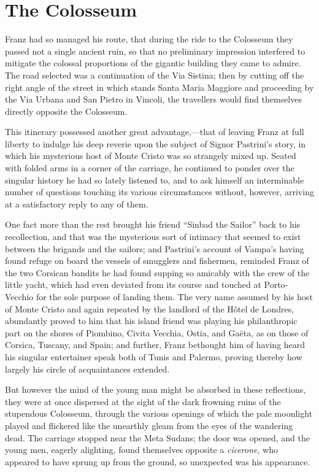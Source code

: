 \chapter{The Colosseum}

Franz had so managed his route, that during the ride to the Colosseum
they passed not a single ancient ruin, so that no preliminary
impression interfered to mitigate the colossal proportions of the
gigantic building they came to admire. The road selected was a
continuation of the Via Sistina; then by cutting off the right angle of
the street in which stands Santa Maria Maggiore and proceeding by the
Via Urbana and San Pietro in Vincoli, the travellers would find
themselves directly opposite the Colosseum.

This itinerary possessed another great advantage,—that of leaving Franz
at full liberty to indulge his deep reverie upon the subject of Signor
Pastrini’s story, in which his mysterious host of Monte Cristo was so
strangely mixed up. Seated with folded arms in a corner of the
carriage, he continued to ponder over the singular history he had so
lately listened to, and to ask himself an interminable number of
questions touching its various circumstances without, however, arriving
at a satisfactory reply to any of them.

One fact more than the rest brought his friend “Sinbad the Sailor” back
to his recollection, and that was the mysterious sort of intimacy that
seemed to exist between the brigands and the sailors; and Pastrini’s
account of Vampa’s having found refuge on board the vessels of
smugglers and fishermen, reminded Franz of the two Corsican bandits he
had found supping so amicably with the crew of the little yacht, which
had even deviated from its course and touched at Porto-Vecchio for the
sole purpose of landing them. The very name assumed by his host of
Monte Cristo and again repeated by the landlord of the Hôtel de
Londres, abundantly proved to him that his island friend was playing
his philanthropic part on the shores of Piombino, Civita Vecchia,
Ostia, and Gaëta, as on those of Corsica, Tuscany, and Spain; and
further, Franz bethought him of having heard his singular entertainer
speak both of Tunis and Palermo, proving thereby how largely his circle
of acquaintances extended.

But however the mind of the young man might be absorbed in these
reflections, they were at once dispersed at the sight of the dark
frowning ruins of the stupendous Colosseum, through the various
openings of which the pale moonlight played and flickered like the
unearthly gleam from the eyes of the wandering dead. The carriage
stopped near the Meta Sudans; the door was opened, and the young men,
eagerly alighting, found themselves opposite a \textit{cicerone}, who appeared
to have sprung up from the ground, so unexpected was his appearance.

